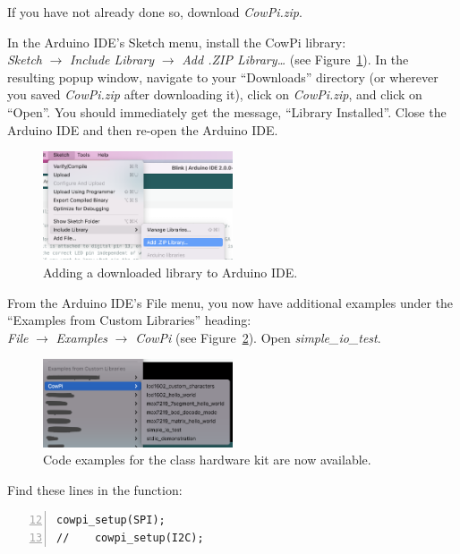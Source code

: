 If you have not already done so, download \textit{CowPi.zip}.

In the Arduino IDE's Sketch menu, install the CowPi library: \\
\textit{Sketch} $\rightarrow$ \textit{Include Library} $\rightarrow$ \textit{Add .ZIP Library\dots}
(see Figure~\ref{fig:add-library}).
In the resulting popup window, navigate to your ``Downloads'' directory (or wherever you saved \textit{CowPi.zip} after downloading it), click on \textit{CowPi.zip}, and click on ``Open''.
You should immediately get the message, ``Library Installed''.
Close the Arduino IDE and then re-open the Arduino IDE\@.

\begin{figure}
    \centering
    \includegraphics[width=0.5\textwidth]{direct/library/add-zip-library}
    \caption{Adding a downloaded library to Arduino IDE. \label{fig:add-library}}
\end{figure}

From the Arduino IDE's File menu, you now have additional examples under the ``Examples from Custom Libraries'' heading: \\
\textit{File} $\rightarrow$ \textit{Examples} $\rightarrow$ \textit{CowPi}
(see Figure~\ref{fig:library-examples}).
Open \textit{simple\_io\_test}.

\begin{figure}
    \centering
    \includegraphics[width=0.5\textwidth]{direct/library/library-examples}
    \caption{Code examples for the class hardware kit are now available. \label{fig:library-examples}}
\end{figure}

Find these lines in the  function:

\begin{lstlisting}[numbers=left, firstnumber=12]
    cowpi_setup(SPI);
//    cowpi_setup(I2C);
\end{lstlisting}

